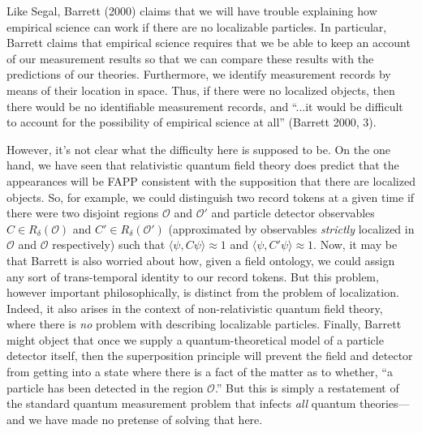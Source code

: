 \documentclass[12pt]{article}
\theoremstyle{remark}
\begin{document}
Like Segal, Barrett (2000) claims that we will have trouble explaining
how empirical science can work if there are no localizable particles.
In particular, Barrett claims that empirical science requires that we
be able to keep an account of our measurement results so that we can
compare these results with the predictions of our theories.
Furthermore, we identify measurement records by means of their
location in space.  Thus, if there were no localized objects, then
there would be no identifiable measurement records, and ``...it would
be difficult to account for the possibility of empirical science at
all'' (Barrett 2000, 3).

However, it's not clear what the difficulty here is supposed to be.
On the one hand, we have seen that relativistic quantum field theory
does predict that the appearances will be FAPP consistent with the
supposition that there are localized objects.  So, for example, we
could distinguish two record tokens at a given time if there were two
disjoint regions $\mathcal{O}$ and $\mathcal{O}'$ and particle
detector observables $C\in R_{\delta}(\mathcal{O})$ and $C'\in
R_{\delta}(\mathcal{O}')$ (approximated by observables \emph{strictly}
localized in $\mathcal{O}$ and $\mathcal{O}$ respectively) such that
$\langle \psi ,C\psi \rangle \approx 1$ and $\langle \psi ,C'\psi
\rangle \approx 1$.  Now, it may be that Barrett is also worried about
how, given a field ontology, we could assign any sort of
trans-temporal identity to our record tokens.  But this problem,
however important philosophically, is distinct from the problem of
localization.  Indeed, it also arises in the context of
non-relativistic quantum field theory, where there is \emph{no}
problem with describing localizable particles.  Finally, Barrett might
object that once we supply a quantum-theoretical model of a particle
detector itself, then the superposition principle will prevent the
field and detector from getting into a state where there is a fact of
the matter as to whether, ``a particle has been detected in the region
$\mathcal{O}$.''  But this is simply a restatement of the standard
quantum measurement problem that infects \emph{all} quantum
theories---and we have made no pretense of solving that here.
\end{document}
